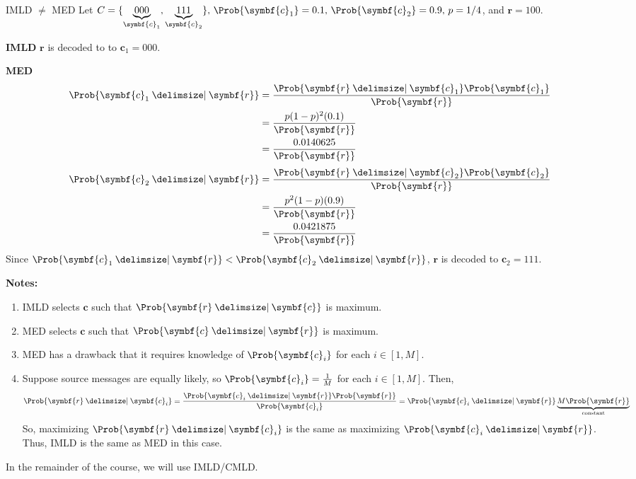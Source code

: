 \begin{Example}{IMLD $ \neq $ MED}{}
    Let $ C=\set{\underbrace{000}_{\symbf{c}_1},\underbrace{111}_{\symbf{c}_2}},\,
        \Prob{\symbf{c}_1}=0.1,\, \Prob{\symbf{c}_2}=0.9,\, p=1/4 $, and $ \symbf{r}=100 $.

    \textbf{IMLD} $ \symbf{r} $ is decoded to to $ \symbf{c}_1 = 000 $.

    \textbf{MED}
    \begin{align*}
        \Prob{\symbf{c}_1\given \symbf{r}}
         & =\frac{\Prob{\symbf{r}\given \symbf{c}_1}\Prob{\symbf{c}_1}}{\Prob{\symbf{r}}} \\
         & =\frac{p(1-p)^2(0.1)}{\Prob{\symbf{r}}}                                        \\
         & =\frac{0.0140625}{\Prob{\symbf{r}}}
    \end{align*}
    \begin{align*}
        \Prob{\symbf{c}_2\given \symbf{r}}
         & =\frac{\Prob{\symbf{r}\given \symbf{c}_2}\Prob{\symbf{c}_2}}{\Prob{\symbf{r}}} \\
         & =\frac{p^2(1-p)(0.9)}{\Prob{\symbf{r}}}                                        \\
         & =\frac{0.0421875}{\Prob{\symbf{r}}}
    \end{align*}
    Since $ \Prob{\symbf{c}_1\given \symbf{r}}<\Prob{\symbf{c}_2\given \symbf{r}} $,
    $ \symbf{r} $ is decoded to $ \symbf{c}_2=111 $.
\end{Example}


\textbf{Notes:}
\begin{enumerate}[label=(\roman*)]
    \item IMLD selects $ \symbf{c} $ such that $ \Prob{\symbf{r}\given \symbf{c}} $ is maximum.
    \item MED selects $ \symbf{c} $ such that $ \Prob{\symbf{c}\given \symbf{r}} $ is maximum.
    \item MED has a drawback that it requires knowledge of $ \Prob{\symbf{c}_i} $ for
          each $ i\in [1,M] $.
    \item Suppose source messages are equally likely, so
          $ \Prob{\symbf{c}_i}=\frac{1}{M} $ for each $ i\in[1,M] $.
          Then,
          \[ \Prob{\symbf{r}\given \symbf{c}_i}=\frac{\Prob{\symbf{c}_i\given \symbf{r}}\Prob{\symbf{r}}}{\Prob{\symbf{c}_i}}
              =\Prob{\symbf{c}_i\given \symbf{r}} \underbrace{M \Prob{\symbf{r}}}_{\text{constant}}\]
          So, maximizing $ \Prob{\symbf{r}\given \symbf{c}_i} $ is the same as maximizing
          $ \Prob{\symbf{c}_i\given \symbf{r}} $. Thus, IMLD is the same as MED in this case.
\end{enumerate}
In the remainder of the course, we will use IMLD/CMLD\@.

